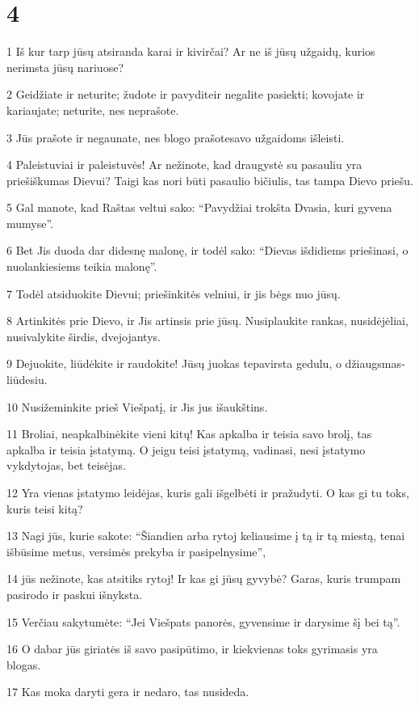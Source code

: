 \chapter{4}


\par 1 Iš kur tarp jūsų atsiranda karai ir kivirčai? Ar ne iš jūsų užgaidų, kurios nerimsta jūsų nariuose? 
\par 2 Geidžiate ir neturite; žudote ir pavydite­ir negalite pasiekti; kovojate ir kariaujate; neturite, nes neprašote. 
\par 3 Jūs prašote ir negaunate, nes blogo prašote­savo užgaidoms išleisti. 
\par 4 Paleistuviai ir paleistuvės! Ar nežinote, kad draugystė su pasauliu yra priešiškumas Dievui? Taigi kas nori būti pasaulio bičiulis, tas tampa Dievo priešu. 
\par 5 Gal manote, kad Raštas veltui sako: “Pavydžiai trokšta Dvasia, kuri gyvena mumyse”. 
\par 6 Bet Jis duoda dar didesnę malonę, ir todėl sako: “Dievas išdidiems priešinasi, o nuolankiesiems teikia malonę”. 
\par 7 Todėl atsiduokite Dievui; priešinkitės velniui, ir jis bėgs nuo jūsų. 
\par 8 Artinkitės prie Dievo, ir Jis artinsis prie jūsų. Nusiplaukite rankas, nusidėjėliai, nusivalykite širdis, dvejojantys. 
\par 9 Dejuokite, liūdėkite ir raudokite! Jūsų juokas tepavirsta gedulu, o džiaugsmas­liūdesiu. 
\par 10 Nusižeminkite prieš Viešpatį, ir Jis jus išaukštins. 
\par 11 Broliai, neapkalbinėkite vieni kitų! Kas apkalba ir teisia savo brolį, tas apkalba ir teisia įstatymą. O jeigu teisi įstatymą, vadinasi, nesi įstatymo vykdytojas, bet teisėjas. 
\par 12 Yra vienas įstatymo leidėjas, kuris gali išgelbėti ir pražudyti. O kas gi tu toks, kuris teisi kitą? 
\par 13 Nagi jūs, kurie sakote: “Šiandien arba rytoj keliausime į tą ir tą miestą, tenai išbūsime metus, versimės prekyba ir pasipelnysime”,­ 
\par 14 jūs nežinote, kas atsitiks rytoj! Ir kas gi jūsų gyvybė? Garas, kuris trumpam pasirodo ir paskui išnyksta. 
\par 15 Verčiau sakytumėte: “Jei Viešpats panorės, gyvensime ir darysime šį bei tą”. 
\par 16 O dabar jūs giriatės iš savo pasipūtimo, ir kiekvienas toks gyrimasis yra blogas. 
\par 17 Kas moka daryti gera ir nedaro, tas nusideda.


